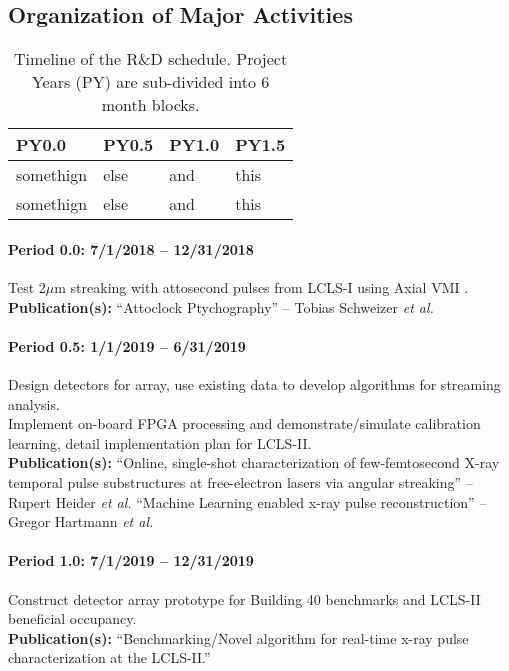 \subsection*{Organization of Major Activities}
\begin{table}
\caption{\label{tab::schedule} Timeline of the R\&D schedule. Project Years (PY) are sub-divided into 6 month blocks. }
\begin{tabular}{l|l|l|l}
\hline
PY0.0 & PY0.5 & PY1.0 & PY1.5\\
\hline
somethign & else& and & this\\
somethign & else& and & this\\
\end{tabular}
\end{table}


\paragraph*{Period 0.0: 7/1/2018 -- 12/31/2018\\}
Test 2$\mu$m streaking with attosecond pulses from LCLS-I using Axial VMI \cite{Siqi2018}.\\
\textbf{Publication(s): }
``Attoclock Ptychography'' -- Tobias Schweizer \textit{et al.} \cite{Feurer2018}

\paragraph*{Period 0.5: 1/1/2019 -- 6/31/2019\\}
Design detectors for array, use existing data to develop algorithms for streaming analysis.\\
Implement on-board FPGA processing and demonstrate/simulate calibration learning, detail implementation plan for LCLS-II.\\
\textbf{Publication(s): }
``Online, single-shot characterization of few-femtosecond X-ray temporal pulse substructures at free-electron lasers via angular streaking'' -- Rupert Heider \textit{et al.}
``Machine Learning enabled x-ray pulse reconstruction'' --  Gregor Hartmann \textit{et al.}

\paragraph*{Period 1.0: 7/1/2019 -- 12/31/2019\\}
Construct detector array prototype for Building 40 benchmarks and LCLS-II beneficial occupancy.\\
\textbf{Publication(s): }
``Benchmarking/Novel algorithm for real-time x-ray pulse characterization at the LCLS-II.''

